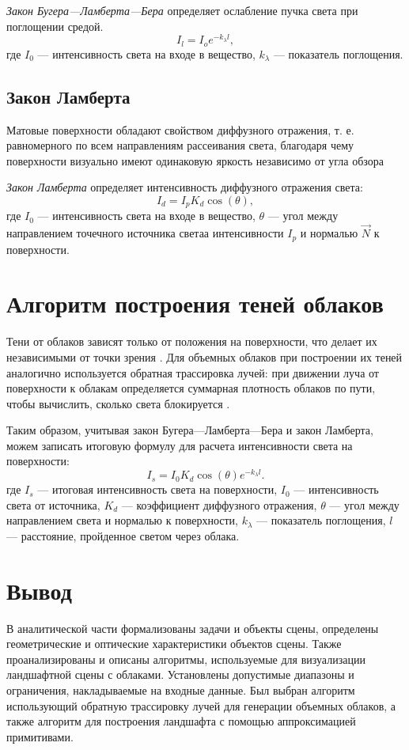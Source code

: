 \textit{Закон Бугера---Ламберта---Бера} определяет ослабление пучка света при поглощении средой.
\begin{equation}
	\label{eq:beers-law}
	I_l=I_{o}e^{-k_{\lambda }l},
\end{equation} где 
{$I_{0}$} — интенсивность света на входе в вещество, 
$k_\lambda$ — показатель поглощения.
\subsection{Закон Ламберта}
Матовые поверхности обладают свойством диффузного отражения, т. е.
равномерного по всем направлениям рассеивания света, благодаря чему поверхности визуально имеют одинаковую яркость независимо от угла обзора \cite{rodgers1989algorithms}

\textit{Закон Ламберта} определяет интенсивность диффузного отражения света:
\begin{equation}
	\label{eq:lambert-law}
	I_d=I_{p}K_d\cos(\theta),
\end{equation} где 
{$I_{0}$} — интенсивность света на входе в вещество, 
$\theta$ — угол между направлением точечного источника светаа
интенсивности $I_p$ и нормалью $\vec{N}$ к поверхности.

\section{Алгоритм построения теней облаков}
Тени от облаков зависят только от положения на поверхности, что делает их независимыми от точки зрения \cite{rodgers1989algorithms}. Для объемных облаков при построении их теней аналогично используется обратная трассировка лучей: при движении луча от поверхности к облакам определяется суммарная
плотность облаков по пути, чтобы вычислить, сколько света блокируется \cite{shadows2023}.

Таким образом, учитывая закон Бугера—Ламберта—Бера и закон Ламберта, можем записать итоговую формулу для расчета интенсивности света на поверхности:
\begin{equation}
	I_s = I_0 K_d \cos(\theta) e^{-k_{\lambda} l}.
\end{equation}
где
	 $I_s$ — итоговая интенсивность света на поверхности,
	 $I_0$ — интенсивность света от источника,
	 $K_d$ — коэффициент диффузного отражения,
	 $\theta$ — угол между направлением света и нормалью к поверхности,
	 $k_{\lambda}$ — показатель поглощения,
	 $l$ — расстояние, пройденное светом через облака.

\section*{Вывод}
В аналитической части формализованы задачи и объекты сцены, определены геометрические и оптические характеристики объектов сцены. Также проанализированы и описаны алгоритмы, используемые для визуализации ландшафтной сцены с облаками. Установлены допустимые диапазоны и ограничения, накладываемые на входные данные.
Был выбран алгоритм использующий обратную трассировку лучей для генерации объемных облаков, а также алгоритм для построения ландшафта с помощью аппроксимацией примитивами.
